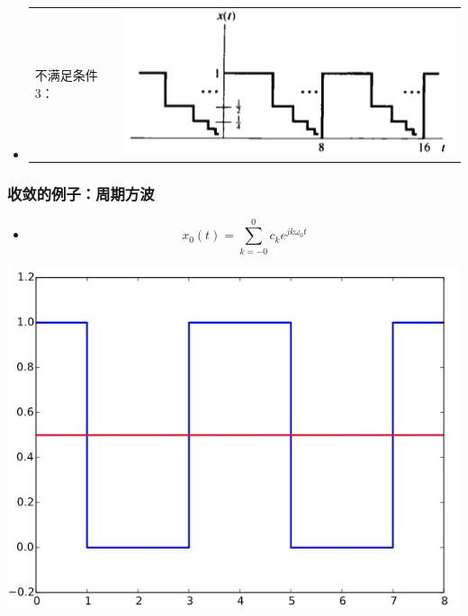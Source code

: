 \documentclass[CJKutf8,xcolor=pdftex,dvipsnames,table]{beamer}
\begin{document}
\begin{CJK*}{UTF8}{song}
\begin{frame}
\begin{itemize}
    \item
	\begin{tabular}{ll}
	\raisebox{-.5\height}

    不满足条件3：
&
    \includegraphics[valign=m,scale=.4]{ss-c-f3-8c}    \\
    \end{tabular}      
    
    \end{itemize}
  \end{frame}  
  
  \begin{frame}
    \frametitle{收敛的例子：周期方波}
    \begin{itemize}
    \item \[ x_{0}(t)=\sum_{k=-0}^{0}c_k e^{jk\omega_0 t} \]
    \end{itemize}
    \begin{center}
      \includegraphics[scale=.4]{ss-c-f3-9aa}
    \end{center}
  \end{frame}     


\end{CJK*}
\end{document}
